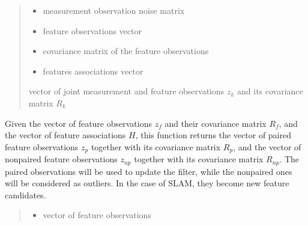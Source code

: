 \documentclass[letterpaper,10pt,english]{sphinxmanual}
\begin{document}
\begin{fulllineitems}
\begin{fulllineitems}
\begin{quote}
\begin{description}
\begin{itemize}
\item {} 
\sphinxAtStartPar
{} \textendash{} measurement observation noise matrix

\item {} 
\sphinxAtStartPar
{} \textendash{} feature observations vector

\item {} 
\sphinxAtStartPar
{} \textendash{} covariance matrix of the feature observations

\item {} 
\sphinxAtStartPar
{} \textendash{} features associations vector

\end{itemize}

\sphinxAtStartPar
vector of joint measurement and feature observations \(z_k\) and its covariance matrix \(R_k\)

\end{description}\end{quote}

\end{fulllineitems}


\begin{fulllineitems}
\label{\detokenize{FEKFMBLocalization:FEKFMBL.FEKFMBL.SplitFeatures}}
\pysigstartsignatures
{}
\pysigstopsignatures
\sphinxAtStartPar
Given the vector of feature observations \(z_f\) and their covariance matrix \(R_f\), and the vector of
feature associations \(H\), this function returns the vector of paired feature observations \(z_p\) together with
its covariance matrix \(R_p\), and the vector of non\sphinxhyphen{}paired feature observations \(z_{np}\) together with its covariance matrix \(R_{np}\).
The paired observations will be used to update the filter, while the non\sphinxhyphen{}paired ones will be considered as outliers.
In the case of SLAM, they become new feature candidates.
\begin{quote}\begin{description}
\begin{itemize}
\item {} 
\sphinxAtStartPar
{} \textendash{} vector of feature observations


\end{itemize}
\end{description}
\end{quote}
\end{fulllineitems}
\end{fulllineitems}
\end{document}
